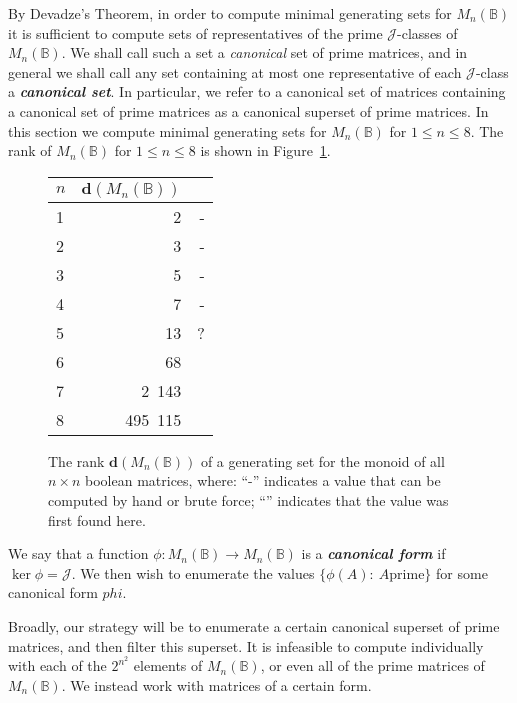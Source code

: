 \documentclass[11pt]{article}
\newcommand{\defn}[1]{\textbf{\textit{#1}}}
\numberwithin{equation}{section}
\renewcommand{\to}{\longrightarrow}
\newcommand{\B}{\mathbb{B}}
\newcommand{\Bn}{M_n(\B)}
\newcommand{\J}{\mathscr{J}}
\newcommand{\cmark}{\ding{51}}
\begin{document}
By Devadze's Theorem, in order to compute minimal generating sets for $\Bn$ it
is sufficient to compute sets of representatives of the prime $\J$-classes of
$\Bn$. We shall call such a set a \emph{canonical} set of prime matrices, and in
general we shall call any set containing at most one representative of each
$\J$-class a \defn{canonical set}. In particular, we refer to a canonical set of
matrices containing a canonical set of prime matrices as a canonical superset of
prime matrices. In this section we compute minimal generating
sets for $\Bn$ for $1 \leq n \leq 8$.  The rank of $\Bn$ for $1 \leq n \leq 8$
is shown in
Figure~\ref{figure-table-1}.
\begin{figure}
  \centering
  \begin{tabular}{l|r|r}
    $n$ & $\mathbf{d}(\Bn)$ &   \\
    \hline
    1 & 2          & - \\ 
    2 & 3          & - \\ 
    3 & 5          & - \\ 
    4 & 7          & - \\
    5 & 13         & ? \\
    6 & 68         & \cmark \\ 
    7 & 2\ 143     & \cmark \\
    8 & 495\ 115   & \cmark \\
  \end{tabular}
\vspace{1cm}

  \caption{The rank $\mathbf{d}(\Bn)$ of a generating set for the monoid
  of all $n \times n$ boolean matrices, where: 
  ``-'' indicates a value that can be computed by hand or brute force;
  ``\cmark'' indicates that the value was first found here.}
  \label{figure-table-1}
\end{figure}

We say that a function $\phi: \Bn \to \Bn$ is a \defn{canonical form} if
$\ker\phi = \J$. We then wish to enumerate the values $\{\phi(A) :\: \text{$A$
    prime}\}$ for some canonical form $phi$.

Broadly, our strategy will be to enumerate a certain canonical superset of prime
matrices, and then filter this superset. It is infeasible to compute
individually with each of the $2^{n^2}$ elements of $\Bn$, or even all of the
prime matrices of $\Bn$. We instead work with matrices of a certain form. 
\end{document}
